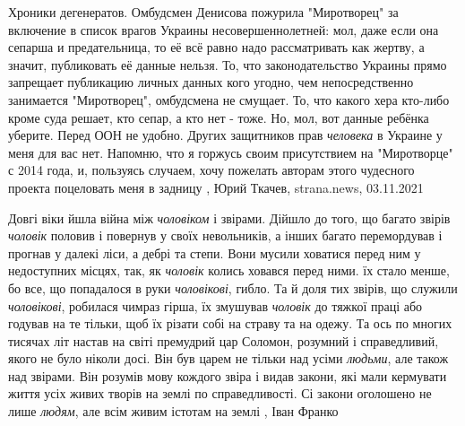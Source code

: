 Хроники дегенератов.  Омбудсмен Денисова пожурила "Миротворец" за включение в
список врагов Украины несовершеннолетней: мол, даже если она сепарша и
предательница, то её всё равно надо рассматривать как жертву, а значит,
публиковать её данные нельзя.  То, что законодательство Украины прямо запрещает
публикацию личных данных кого угодно, чем непосредственно занимается
"Миротворец", омбудсмена не смущает. То, что какого хера кто-либо кроме суда
решает, кто сепар, а кто нет - тоже. Но, мол, вот данные ребёнка уберите.
Перед ООН не удобно. Других защитников прав \emph{человека} в Украине у меня
для вас нет. Напомню, что я горжусь своим присутствием на "Миротворце" с 2014
года, и, пользуясь случаем, хочу пожелать авторам этого чудесного проекта
поцеловать меня в задницу
, 
Юрий Ткачев, strana.news, 03.11.2021

Довгі віки йшла війна між \emph{чоловіком} і звірами. Дійшло до того, що багато звірів
\emph{чоловік} половив і повернув у своїх невольників, а інших багато перемордував і
прогнав у далекі ліси, а дебрі та степи. Вони мусили ховатися перед ним у
недоступних місцях, так, як \emph{чоловік} колись ховався перед ними. їх стало менше,
бо все, що попадалося в руки \emph{чоловікові}, гибло. Та й доля тих звірів, що
служили \emph{чоловікові}, робилася чимраз гірша, їх змушував \emph{чоловік} до тяжкої праці
або годував на те тільки, щоб їх різати собі на страву та на одежу.  Та ось по
многих тисячах літ настав на світі премудрий цар Соломон, розумний і
справедливий, якого не було ніколи досі. Він був царем не тільки над усіми
\emph{людьми}, але також над звірами. Він розумів мову кождого звіра і видав закони,
які мали кермувати життя усіх живих творів на землі по справедливості. Сі
закони оголошено не лише \emph{людям}, але всім живим істотам на землі
, Іван Франко


